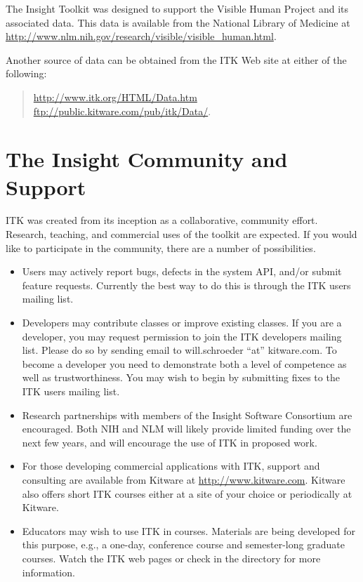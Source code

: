 The Insight Toolkit was designed to support the Visible Human Project
and its associated data. This data is available from the National Library of
Medicine at \url{http://www.nlm.nih.gov/research/visible/visible_human.html}.

Another source of data can be obtained from the ITK Web site at either
of the following:
\begin{quote}
\url{http://www.itk.org/HTML/Data.htm} \\
\url{ftp://public.kitware.com/pub/itk/Data/}.
\end{quote}

\section{The Insight Community and Support}
\label{sec:AdditionalResources}

ITK was created from its inception as a collaborative, community
effort. Research, teaching, and commercial uses of the toolkit are
expected. If you would like to participate in the community, there are a
number of possibilities.

\begin{itemize}
       \item Users may actively report bugs, defects in the system API,
       and/or submit feature requests. Currently the best way to do this is
       through the ITK users mailing list.

       \item Developers may contribute classes or improve existing
       classes. If you are a developer, you may request permission to join
       the ITK developers mailing list. Please do so by sending email to
       will.schroeder ``at'' kitware.com. To become a developer you need to
       demonstrate both a level of competence as well as
       trustworthiness. You may wish to begin by submitting fixes to the ITK
       users mailing list.

       \item Research partnerships with members of the Insight Software
       Consortium are encouraged. Both NIH and NLM will likely provide
       limited funding over the next few years, and will encourage the use of
       ITK in proposed work.

       \item For those developing commercial applications with ITK,
       support and consulting are available from Kitware at
       \url{http://www.kitware.com}. Kitware also offers short ITK courses
       either at a site of your choice or periodically at Kitware.

       \item Educators may wish to use ITK in courses. Materials are being
       developed for this purpose, e.g., a one-day, conference course and
       semester-long graduate courses. Watch the ITK web pages or check in
       the  directory for more information.
\end{itemize}

